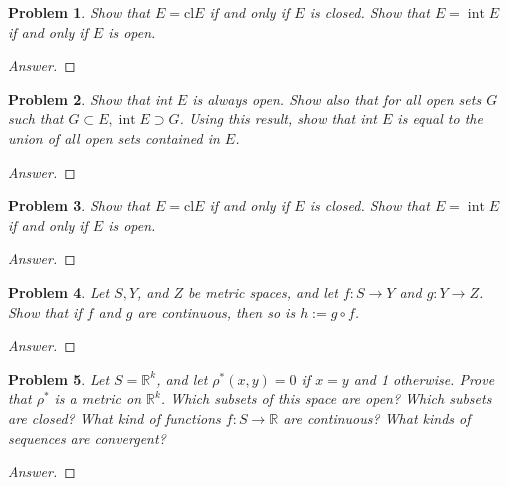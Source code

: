 \documentclass{article}
\newtheorem{problem}{Problem}
\begin{document}
\begin{problem}
Show that $E=\mathrm{cl} E$ if and only if $E$ is closed. Show that $E=\operatorname{int} E$ if and only if $E$ is open.
\end{problem}

\begin{proof}[Answer]
    
\end{proof}

\begin{problem}
Show that int $E$ is always open. Show also that for all open sets $G$ such that $G \subset E, \operatorname{int} E \supset G$. Using this result, show that int $E$ is equal to the union of all open sets contained in $E$.
\end{problem}

\begin{proof}[Answer]
    
\end{proof}

\begin{problem}
Show that $E=\mathrm{cl} E$ if and only if $E$ is closed. Show that $E=\operatorname{int} E$ if and only if $E$ is open.
\end{problem}

\begin{proof}[Answer]
    
\end{proof}

\begin{problem}
Let $S, Y$, and $Z$ be metric spaces, and let $f: S \rightarrow Y$ and $g: Y \rightarrow Z$. Show that if $f$ and $g$ are continuous, then so is $h:=g \circ f$.
\end{problem}

\begin{proof}[Answer]
    
\end{proof}

\begin{problem}
Let $S=\mathbb{R}^{k}$, and let $\rho^{*}(x, y)=0$ if $x=y$ and 1 otherwise. Prove that $\rho^{*}$ is a metric on $\mathbb{R}^{k}$. Which subsets of this space are open? Which subsets are closed? What kind of functions $f: S \rightarrow \mathbb{R}$ are continuous? What kinds of sequences are convergent?
\end{problem}

\begin{proof}[Answer]
    
\end{proof}
\end{document}
